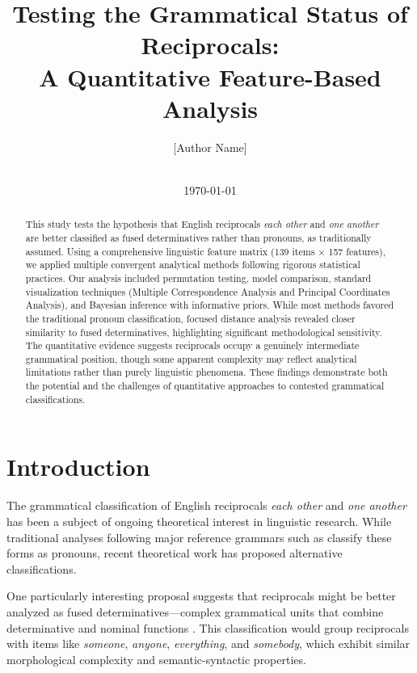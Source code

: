 \documentclass[12pt]{article}
\title{Testing the Grammatical Status of Reciprocals: \\
A Quantitative Feature-Based Analysis}
\author{[Author Name] \\
[Institution] \\
[Email]}
\date{\today}
\begin{document}
\maketitle

\begin{abstract}
This study tests the hypothesis that English reciprocals \textit{each other} and \textit{one another} are better classified as fused determinatives rather than pronouns, as traditionally assumed. Using a comprehensive linguistic feature matrix (139 items × 157 features), we applied multiple convergent analytical methods following rigorous statistical practices. Our analysis included permutation testing, model comparison, standard visualization techniques (Multiple Correspondence Analysis and Principal Coordinates Analysis), and Bayesian inference with informative priors. While most methods favored the traditional pronoun classification, focused distance analysis revealed closer similarity to fused determinatives, highlighting significant methodological sensitivity. The quantitative evidence suggests reciprocals occupy a genuinely intermediate grammatical position, though some apparent complexity may reflect analytical limitations rather than purely linguistic phenomena. These findings demonstrate both the potential and the challenges of quantitative approaches to contested grammatical classifications.
\end{abstract}

\section{Introduction}

The grammatical classification of English reciprocals \textit{each other} and \textit{one another} has been a subject of ongoing theoretical interest in linguistic research. While traditional analyses following major reference grammars such as \citet{huddleston2002cambridge} classify these forms as pronouns, recent theoretical work has proposed alternative classifications.

One particularly interesting proposal suggests that reciprocals might be better analyzed as fused determinatives—complex grammatical units that combine determinative and nominal functions \citep{payne2007fusion}. This classification would group reciprocals with items like \textit{someone}, \textit{anyone}, \textit{everything}, and \textit{somebody}, which exhibit similar morphological complexity and semantic-syntactic properties.
\end{document}
